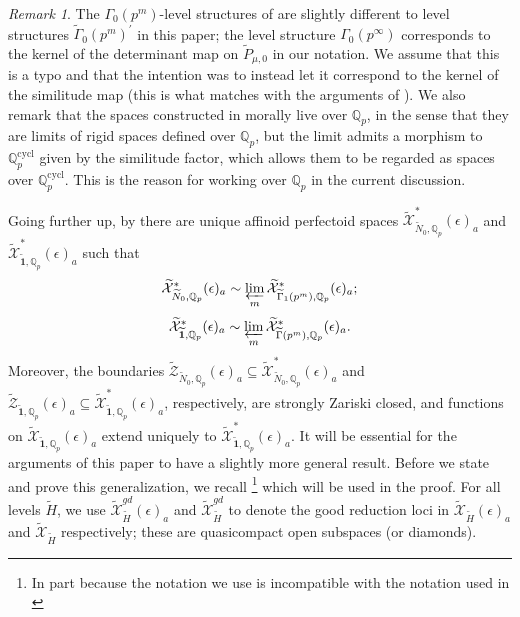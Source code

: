 \documentclass{amsart}
\theoremstyle{remark}
\newtheorem{rem}[subsubsection]{Remark}
\numberwithin{equation}{subsection}
\newcommand{\Q}{\QQ}
\newcommand{\QQ}{{\mathbb Q}}
\newcommand{\cX}{{\mathcal X}}
\newcommand{\cZ}{{\mathcal Z}}
\newcommand{\Qp}{\Q_p}
\newcommand{\mbf}{\mathbf}
\newcommand{\cycl}{\mathrm{cycl}}
\newcommand{\tGam}{\widetilde{\Gamma}}
\newcommand{\tH}{\widetilde{H}}
\newcommand{\tN}{\widetilde{N}}
\newcommand{\tP}{\widetilde{P}}
\newcommand{\wt}{\widetilde}
\newcommand{\sub}{\subseteq}
\renewcommand{\(}{\left(}
\renewcommand{\)}{\right)}
\begin{document}
\begin{rem}
The $\Gamma_{0}(p^{m})$-level structures of \cite[Definition 3.1.1]{scholze-galois} are slightly different to level structures $\tGam_{0}(p^{m})^{\prime}$ in this paper; the level structure $\Gamma_{0}(p^{\infty})$ corresponds to the kernel of the determinant map on $\tP_{\mu,0}$ in our notation. We assume that this is a typo and that the intention was to instead let it correspond to the kernel of the similitude map (this is what matches with the arguments of \cite[\S 3]{scholze-galois}). We also remark that the spaces constructed in \cite[\S 3]{scholze-galois} morally live over $\Qp$, in the sense that they are limits of rigid spaces defined over $\Qp$, but the limit admits a morphism to $\Qp^\cycl$ given by the similitude factor, which allows them to be regarded as spaces over $\Qp^\cycl$. This is the reason for working over $\Qp$ in the current discussion.
\end{rem}

Going further up, by \cite[Proposition 3.2.34, Theorem 3.2.36]{scholze-galois} there are unique affinoid perfectoid spaces $\wt{\cX}^{\ast}_{\tN_{0},\Qp}(\epsilon)_a$ and $\wt{\cX}^{\ast}_{\wt{\mbf{1}},\Qp}(\epsilon)_a$ such that
\[ 
\wt{\cX}^{\ast}_{\tN_{0},\Qp}(\epsilon)_a \sim \varprojlim_{m} \wt{\cX}^{\ast}_{\tGam_1(p^m),\Qp}(\epsilon)_{a}; 
\]
\[ \wt{\cX}^{\ast}_{\wt{\mbf{1}},\Qp}(\epsilon)_{a} \sim \varprojlim_{m} \wt{\cX}^{\ast}_{\tGam(p^m),\Qp}(\epsilon)_{a} . 
\]
Moreover, the boundaries $\wt{\cZ}_{\tN_{0},\Qp}(\epsilon)_{a} \sub \wt{\cX}^\ast_{\tN_{0},\Qp}(\epsilon)_{a}$ and $\wt{\cZ}_{\wt{\mbf{1}},\Qp}(\epsilon)_{a} \sub \wt{\cX}^{\ast}_{\wt{\mbf{1}},\Qp}(\epsilon)_{a}$, respectively, are strongly Zariski closed, and functions on $\wt{\cX}_{\wt{\mbf{1}},\Qp}(\epsilon)_{a}$ extend uniquely to $\wt{\cX}^{\ast}_{\wt{\mbf{1}},\Qp}(\epsilon)_{a}$. It will be essential for the arguments of this paper to have a slightly more general result. Before we state and prove this generalization, we recall \cite[Lemma 3.2.24(iii)]{scholze-galois}\footnote{In part because the notation we use is incompatible with the notation used in \cite[Lemma 3.2.24(iii)]{scholze-galois}} which will be used in the proof. For all levels $\tH$, we use $\wt{\cX}^{gd}_{\tH}(\epsilon)_{a}$ and $\wt{\cX}^{gd}_{\tH}$ to denote the good reduction loci in $\wt{\cX}_{\tH}(\epsilon)_{a}$ and $\wt{\cX}_{\tH}$ respectively; these are quasicompact open subspaces (or diamonds).
\end{document}
